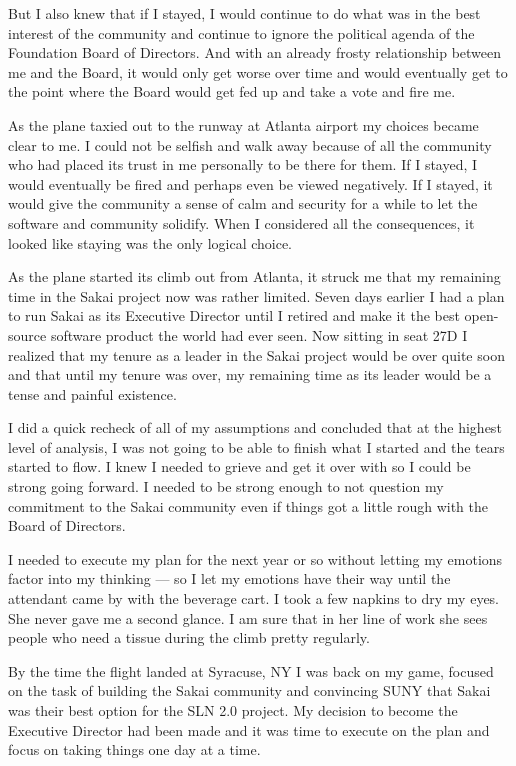\documentclass[12pt]{book}
\begin{document}
But I also knew that if I stayed, I would continue to
do what was in the best interest of the community and
continue to ignore the political agenda of the Foundation
Board of Directors.  And with an already frosty relationship
between me and the Board, it would only get worse over
time and would eventually get to the point where the
Board would get fed up and take a vote and fire me.

As the plane taxied out to the runway at Atlanta airport
my choices became clear to me.   I could not be
selfish and walk away because of all the community who
had placed its trust in me personally to be there for
them.  If I stayed, I would  eventually be fired and
perhaps even be viewed negatively.
If I stayed, it would give the community a sense of calm and
security for a while to let the software and community
solidify.  When I considered all the consequences,
it looked like staying was the only logical choice.

As the plane started its climb out from Atlanta, it
struck me that my remaining time in the Sakai project
now was rather limited.  Seven days earlier I had a
plan to run Sakai as its Executive Director
until I retired
and make it the best open-source software product the
world had ever seen.
Now sitting in seat 27D I realized that my tenure as
a leader in the Sakai project would be over quite soon
and that until my tenure was over, my remaining time
as its leader would be a tense and painful existence.

I did a quick recheck of all of my assumptions and
concluded that at the highest level of analysis, I
was not going to be able to finish what I started and
the tears started to flow.  I knew I needed to grieve
and get it over with so I could be strong
going forward.  I needed to be strong enough to not
question my commitment to the Sakai community even if things
got a little rough with the Board of Directors.

I needed to execute my plan for
the next year or so without letting my emotions factor
into my thinking --- so I let my emotions have their way
until the attendant came by with the beverage cart.  I
took a few napkins to dry my eyes.  She never gave me
a second glance. I am sure that in her line of work
she sees people who need a tissue during the climb
pretty regularly.

By the time the flight landed at Syracuse, NY I was back on
my game, focused on the task of building the
Sakai community and convincing SUNY that Sakai was their
best option for the SLN 2.0 project.
My decision to become the Executive Director had been made
and it was time to execute on the plan and focus on
taking things one day at a time.
\end{document}
